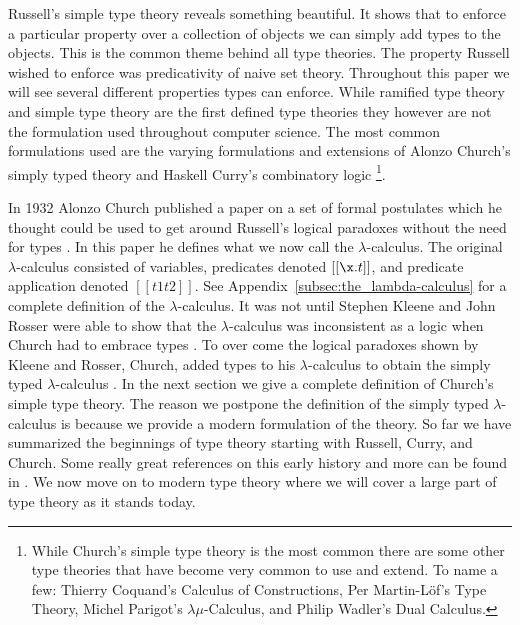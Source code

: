 Russell's simple type theory reveals something beautiful.  It shows
that to enforce a particular property over a collection of objects we
can simply add types to the objects.  This is the common theme behind
all type theories.  The property Russell wished to enforce was
predicativity of naive set theory.  Throughout this paper we will see
several different properties types can enforce.  While ramified type
theory and simple type theory are the first defined type theories they
however are not the formulation used throughout computer science.  The
most common formulations used are the varying formulations and
extensions of Alonzo Church's simply typed theory and Haskell Curry's
combinatory logic \cite{Church:1940,Cardone:2006} 
\footnote{While Church's simple type theory is the most common there
  are some other type theories that have become very common to use and
  extend.  To name a few: Thierry Coquand's Calculus of Constructions,
  Per Martin-L\"of's Type Theory, Michel Parigot's
  $\lambda\mu$-Calculus, and Philip Wadler's Dual Calculus.}.  

In 1932 Alonzo Church published a paper on a set of formal postulates
which he thought could be used to get around Russell's logical
paradoxes without the need for types \cite{Church:1933}.  In this
paper he defines what we now call the $\lambda$-calculus.  The
original $\lambda$-calculus consisted of variables, predicates denoted
$[[\x.t]]$, and predicate application denoted $[[t1 t2]]$.  See
Appendix~\ref{subsec:the_lambda-calculus} for a complete definition of
the $\lambda$-calculus.  It was not until Stephen Kleene and John Rosser were
able to show that the $\lambda$-calculus was inconsistent as a logic
when Church had to embrace types \cite{Kleene:1935}.  To over come the
logical paradoxes shown by Kleene and Rosser, Church, added types to
his $\lambda$-calculus to obtain the simply typed $\lambda$-calculus
\cite{Church:1940,Andrews:2009}.  In the next section we give a
complete definition of Church's simple type theory.  The reason we
postpone the definition of the simply typed $\lambda$-calculus is
because we provide a modern formulation of the theory.  So far we have
summarized the beginnings of type theory starting with Russell, Curry,
and Church.  Some really great references on this early history and more
can be found in \cite{Cardone:2006,Coquand:2010b,Barendregt:1992}.  We now
move on to modern type theory where we will cover a large part of type
theory as it stands today.

